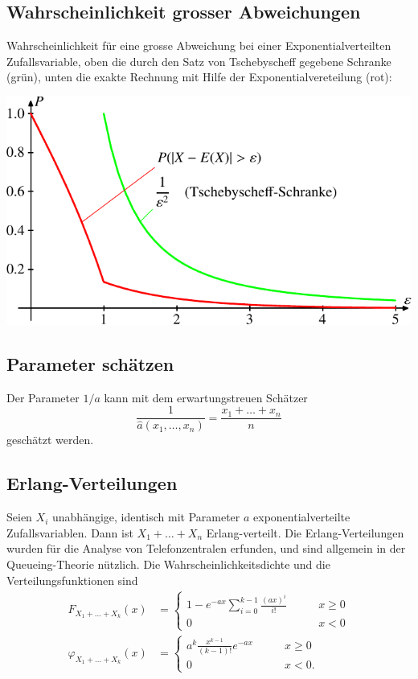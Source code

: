 \subsection{Wahrscheinlichkeit grosser Abweichungen}
Wahrscheinlichkeit für eine grosse Abweichung bei einer
Exponentialverteilten Zufallsvariable, oben die durch den Satz von Tschebyscheff
gegebene Schranke (grün), unten die exakte Rechnung mit
Hilfe der Exponentialvereteilung (rot):
\begin{center}
\includegraphics{images/exp-1.pdf}
\end{center}

\subsection{Parameter schätzen}
Der Parameter $1/a$ kann mit dem erwartungstreuen Schätzer
\[
\frac1{\hat a(x_1,\dots,x_n)}=\frac{x_1+\dots+x_n}n
\]
geschätzt werden.

\subsection{Erlang-Verteilungen}
Seien $X_i$ unabhängige, identisch mit Parameter $a$ exponentialverteilte
Zufallsvariablen.
Dann ist $X_1+\dots+X_n$ Erlang-verteilt. 
Die Erlang-Verteilungen wurden für die Analyse von Telefonzentralen erfunden,
und sind allgemein in der Queueing-Theorie nützlich.
Die Wahrscheinlichkeitsdichte und die Verteilungsfunktionen sind
\begin{align*}
F_{X_1+\dots+X_k}(x)&=\begin{cases}
\displaystyle 1-e^{-ax}\sum_{i=0}^{k-1}\frac{(ax)^i}{i!}&\qquad x\ge 0\\
\displaystyle 0&\qquad x < 0
\end{cases}
\\
\varphi_{X_1+\dots+X_k}(x)&=\begin{cases}
\displaystyle a^k\frac{x^{k-1}}{(k-1)!}e^{-ax}&\qquad x\ge 0\\
\displaystyle 0&\qquad x<0.
\end{cases}
\end{align*}
